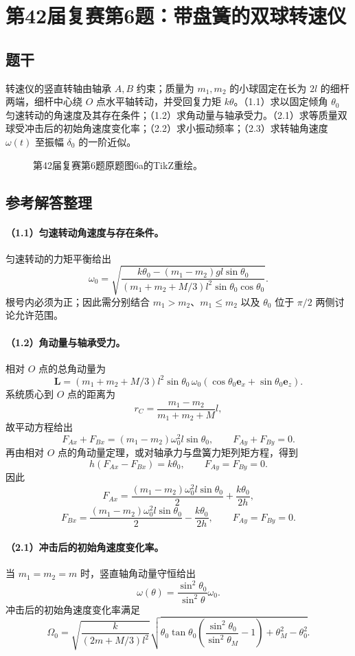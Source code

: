 \section{第42届复赛第6题：带盘簧的双球转速仪}
\subsection{题干}
转速仪的竖直转轴由轴承 $A,B$ 约束；质量为 $m_1,m_2$ 的小球固定在长为 $2l$ 的细杆两端，细杆中心绕 $O$ 点水平轴转动，并受回复力矩 $k\theta$。（1.1）求以固定倾角 $\theta_0$ 匀速转动的角速度及其存在条件；（1.2）求角动量与轴承受力。（2.1）求等质量双球受冲击后的初始角速度变化率；（2.2）求小振动频率；（2.3）求转轴角速度 $\omega(t)$ 至振幅 $\delta_0$ 的一阶近似。
\begin{figure}[htbp]\centering\caption{第42届复赛第6题原题图6a的TikZ重绘。}\end{figure}
\subsection{参考解答整理}
\paragraph{（1.1）匀速转动角速度与存在条件。}
匀速转动的力矩平衡给出
\[\omega_0=\sqrt{\frac{k\theta_0-(m_1-m_2)gl\sin\theta_0}{(m_1+m_2+M/3)l^2\sin\theta_0\cos\theta_0}}.\]
根号内必须为正；因此需分别结合 $m_1>m_2$、$m_1\leq m_2$ 以及 $\theta_0$ 位于 $\pi/2$ 两侧讨论允许范围。
\paragraph{（1.2）角动量与轴承受力。}
相对 $O$ 点的总角动量为
\[\boldsymbol L=(m_1+m_2+M/3)l^2\sin\theta_0\,\omega_0(\cos\theta_0\boldsymbol e_x+\sin\theta_0\boldsymbol e_z).\]
系统质心到 $O$ 点的距离为
\[
r_C=\frac{m_1-m_2}{m_1+m_2+M}l,
\]
故平动方程给出
\[
F_{Ax}+F_{Bx}=(m_1-m_2)\omega_0^2l\sin\theta_0,
\qquad F_{Ay}+F_{By}=0.
\]
再由相对 $O$ 点的角动量定理，或对轴承力与盘簧力矩列矩方程，得到
\[
h(F_{Ax}-F_{Bx})=k\theta_0,
\qquad F_{Ay}=F_{By}=0.
\]
因此
\[
\boxed{F_{Ax}=\frac{(m_1-m_2)\omega_0^2l\sin\theta_0}{2}
+\frac{k\theta_0}{2h}},
\]
\[
\boxed{F_{Bx}=\frac{(m_1-m_2)\omega_0^2l\sin\theta_0}{2}
-\frac{k\theta_0}{2h}},
\qquad F_{Ay}=F_{By}=0.
\]

\paragraph{（2.1）冲击后的初始角速度变化率。}
当 $m_1=m_2=m$ 时，竖直轴角动量守恒给出
\[\omega(\theta)=\frac{\sin^2\theta_0}{\sin^2\theta}\omega_0.\]
冲击后的初始角速度变化率满足
\[\Omega_0=\sqrt{\frac{k}{(2m+M/3)l^2}}\sqrt{\theta_0\tan\theta_0\left(\frac{\sin^2\theta_0}{\sin^2\theta_M}-1\right)+\theta_M^2-\theta_0^2}.\]
